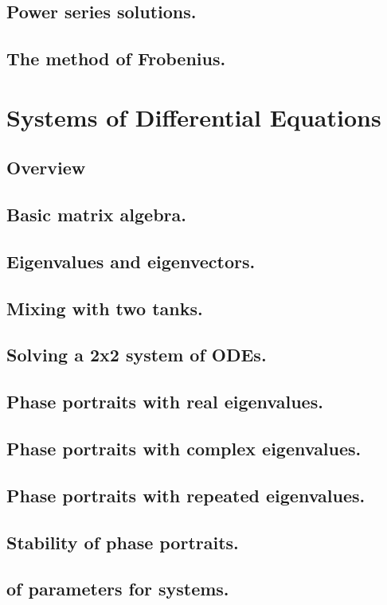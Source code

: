 \documentclass{article}
\begin{document}
\subsection{Power series solutions.}
\subsection{The method of Frobenius.}

\pagebreak

\section{Systems of Differential Equations}
\subsection*{Overview}

\subsection{Basic matrix algebra.}
\subsection{Eigenvalues and eigenvectors.}
\subsection{Mixing with two tanks.}
\subsection{Solving a 2x2 system of ODEs.}
\subsection{Phase portraits with real eigenvalues.}
\subsection{Phase portraits with complex eigenvalues.}
\subsection{Phase portraits with repeated eigenvalues.}
\subsection{Stability of phase portraits.}
\subsection{of parameters for systems.}
\end{document}

